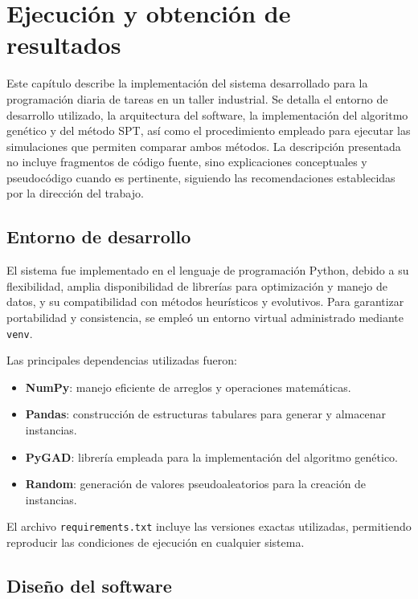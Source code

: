 \chapter{Ejecución y obtención de resultados}

Este capítulo describe la implementación del sistema desarrollado para la programación diaria de tareas en un taller industrial. Se detalla el entorno de desarrollo utilizado, la arquitectura del software, la implementación del algoritmo genético y del método SPT, así como el procedimiento empleado para ejecutar las simulaciones que permiten comparar ambos métodos. La descripción presentada no incluye fragmentos de código fuente, sino explicaciones conceptuales y pseudocódigo cuando es pertinente, siguiendo las recomendaciones establecidas por la dirección del trabajo.
\section{Entorno de desarrollo}

El sistema fue implementado en el lenguaje de programación Python, debido a su flexibilidad, amplia disponibilidad de librerías para optimización y manejo de datos, y su compatibilidad con métodos heurísticos y evolutivos. Para garantizar portabilidad y consistencia, se empleó un entorno virtual administrado mediante \texttt{venv}.

Las principales dependencias utilizadas fueron:

\begin{itemize}
    \item \textbf{NumPy}: manejo eficiente de arreglos y operaciones matemáticas.
    \item \textbf{Pandas}: construcción de estructuras tabulares para generar y almacenar instancias.
    \item \textbf{PyGAD}: librería empleada para la implementación del algoritmo genético.
    \item \textbf{Random}: generación de valores pseudoaleatorios para la creación de instancias.
\end{itemize}

El archivo \texttt{requirements.txt} incluye las versiones exactas utilizadas, permitiendo reproducir las condiciones de ejecución en cualquier sistema.

\section{Diseño del software}

